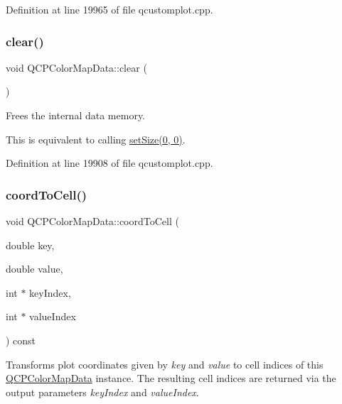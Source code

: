 Definition at line 19965 of file qcustomplot.\+cpp.

\mbox{\label{class_q_c_p_color_map_data_a9910ba830e96955bd5c8e5bef1e77ef3}} 
\subsubsection{\texorpdfstring{clear()}{clear()}}
{\footnotesize\ttfamily void Q\+C\+P\+Color\+Map\+Data\+::clear (\begin{DoxyParamCaption}{ }\end{DoxyParamCaption})}

Frees the internal data memory.

This is equivalent to calling \hyperlink{class_q_c_p_color_map_data_a0d9ff35c299d0478b682bfbcdd9c097e}{set\+Size(0, 0)}. 

Definition at line 19908 of file qcustomplot.\+cpp.

\mbox{\label{class_q_c_p_color_map_data_aca5b29e0ca2f299c9060fc6e1f74d0c8}} 
\subsubsection{\texorpdfstring{coord\+To\+Cell()}{coordToCell()}}
{\footnotesize\ttfamily void Q\+C\+P\+Color\+Map\+Data\+::coord\+To\+Cell (\begin{DoxyParamCaption}\item[{double}]{key,  }\item[{double}]{value,  }\item[{int $\ast$}]{key\+Index,  }\item[{int $\ast$}]{value\+Index }\end{DoxyParamCaption}) const}

Transforms plot coordinates given by {\itshape key} and {\itshape value} to cell indices of this \hyperlink{class_q_c_p_color_map_data}{Q\+C\+P\+Color\+Map\+Data} instance. The resulting cell indices are returned via the output parameters {\itshape key\+Index} and {\itshape value\+Index}.

